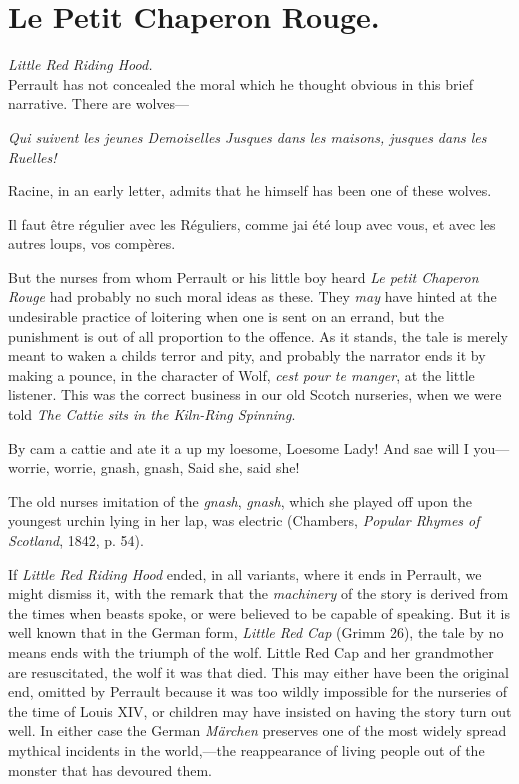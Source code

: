 \documentclass[14pt,a4paper]{memoir}
\newcommand{\notesection}[1]{%
  \addtonotes{\protect\par\protect\vspace{2ex}\protect\noindent\textbf{#1}\protect\par\protect\vspace{1ex}}%
}
\begin{document}
{\section{Le Petit Chaperon Rouge.}
\notesection{Le Petit Chaperon Rouge.}

\emph{Little Red Riding Hood.} \\

Perrault has not concealed the moral which he thought obvious in this
brief narrative. There are wolves---

\emph{{\textquotesingle Qui suivent les jeunes Demoiselles} {Jusques
dans les maisons, jusques dans les Ruelles!\textquotesingle{}}}

Racine, in an early letter, admits that he himself has been one of these
wolves.

\textquotesingle Il faut être régulier avec les Réguliers, comme
j\textquotesingle ai été loup avec vous, et avec les autres loups, vos
compères.\textquotesingle{}

But the nurses from whom Perrault or his little boy heard \emph{Le petit
Chaperon Rouge} had probably no such moral ideas as these. They
\emph{may} have hinted at the undesirable practice of loitering when one
is sent on an errand, but the punishment is out of all proportion to the
offence. As it stands, the tale is merely meant to waken a
child\textquotesingle s terror and pity, and probably the narrator ends
it by making a pounce, in the character of Wolf,
\emph{c\textquotesingle est pour te manger}, at the little listener.
This was the correct \textquotesingle business\textquotesingle{} in our
old Scotch nurseries, when we were told \emph{The Cattie sits in the
Kiln-Ring Spinning}.

{\textquotesingle By cam\textquotesingle{} a cattie and ate it
a\textquotesingle{} up my loesome,} {Loesome Lady!} {And sae will I
you---worrie, worrie, gnash, gnash,} {Said she, said
she!\textquotesingle{}}

\textquotesingle The old nurse\textquotesingle s imitation of the
\emph{gnash}, \emph{gnash}, which she played off upon the youngest
urchin lying in her lap, was electric\textquotesingle{} (Chambers,
\emph{Popular Rhymes of Scotland}, 1842, p. 54).

If \emph{Little Red Riding Hood} ended, in all variants, where it ends
in Perrault, we might dismiss it, with the remark that the
\emph{machinery} of the story is derived from \textquotesingle the times
when beasts spoke,\textquotesingle{} or were believed to be capable of
speaking. But it is well known that in the German form, \emph{Little Red
Cap} (Grimm 26), the tale by no means ends with the triumph of the wolf.
Little Red Cap and her grandmother are resuscitated,
\textquotesingle the wolf it was that died.\textquotesingle{} This may
either have been the original end, omitted by Perrault because it was
too wildly impossible for the nurseries of the time of Louis XIV, or
children may have insisted on having the story \textquotesingle turn out
well.\textquotesingle{} In either case the German \emph{Märchen}
preserves one of the most widely spread mythical incidents in the
world,---the reappearance of living people out of the monster that has
devoured them.

}
\end{document}
